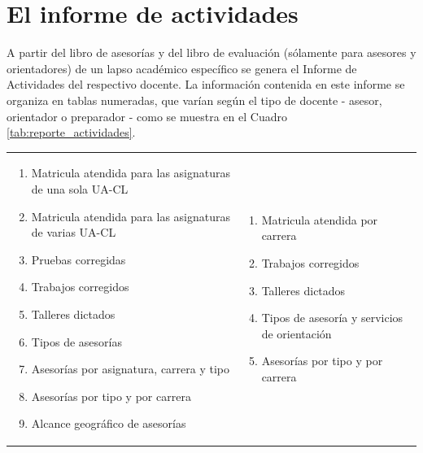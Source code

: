 \documentclass[letterpaper,12pt]{book}
\begin{document}
\section{El informe de actividades}

A partir del libro de asesorías y del libro de evaluación (sólamente para asesores y orientadores) de un lapso académico específico se genera el Informe de Actividades del respectivo docente.  La información contenida en este informe se organiza en tablas numeradas, que varían según el tipo de docente - asesor, orientador o preparador - como se muestra en el Cuadro \ref{tab:reporte_actividades}. 

\vspace{2ex}
\begin{table}[!ht]
	\centering
	\begin{tabular}{|p{30ex}|p{30ex}|}
		\hline
		\cellcolor{navy}{\makebox[30ex][c]{\textcolor{white}{Asesores}}} & \cellcolor{charcoal}\makebox[30ex][c]{\textcolor{white}{Orientadores}}\\
		\hline
		\multirow{3}{*}{\parbox[t]{27ex}{
			\begin{enumerate}[label=\protect\fcolorbox{navy}{navy}{\textcolor{white}{\theenumi}}]
				\item Matricula atendida para las asignaturas de una sola UA-CL
				\item Matricula atendida para las asignaturas de varias UA-CL
				\item Pruebas corregidas
				\item Trabajos corregidos
				\item Talleres dictados
				\item Tipos de asesorías
				\item Asesorías por asignatura, carrera y tipo
				\item Asesorías por tipo y por carrera
				\item Alcance geográfico de asesorías
		  \end{enumerate}
		}} & \parbox[t]{27ex}{
			\begin{enumerate}[label=\protect\fcolorbox{charcoal}{charcoal}{\textcolor{white}{\theenumi}}]
				\itemsep0em
				\item Matricula atendida por carrera
				\item Trabajos corregidos
				\item Talleres dictados
				\item Tipos de asesoría y servicios de orientación
				\item Asesorías por tipo y por carrera

\end{enumerate}}
\end{tabular}
\end{table}
\end{document}
